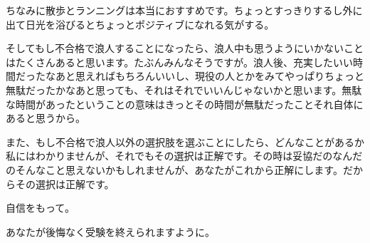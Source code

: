 ちなみに散歩とランニングは本当におすすめです。ちょっとすっきりするし外に出て日光を浴びるとちょっとポジティブになれる気がする。

そしてもし不合格で浪人することになったら、浪人中も思うようにいかないことはたくさんあると思います。たぶんみんなそうですが。浪人後、充実したいい時間だったなあと思えればもちろんいいし、現役の人とかをみてやっぱりちょっと無駄だったかなあと思っても、それはそれでいいんじゃないかと思います。無駄な時間があったということの意味はきっとその時間が無駄だったことそれ自体にあると思うから。

また、もし不合格で浪人以外の選択肢を選ぶことにしたら、どんなことがあるか私にはわかりませんが、それでもその選択は正解です。その時は妥協だのなんだのそんなこと思えないかもしれませんが、あなたがこれから正解にします。だからその選択は正解です。

自信をもって。

あなたが後悔なく受験を終えられますように。
